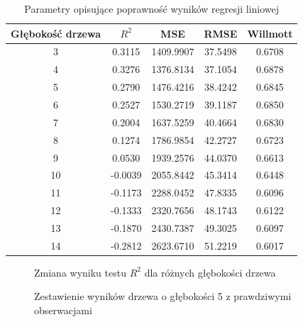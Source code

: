 \documentclass[10pt,a4paper]{article}
\begin{document}
\begin{table}[h!]
	\centering
	\begin{tabular}{|c|c|c|c|c|}
		\hline
		Głębokość drzewa & $R^2$ & MSE & RMSE & Willmott \\
		\hline
		3  & 0.3115 & 1409.9907 & 37.5498 & 0.6708 \\
		4  & 0.3276 & 1376.8134 & 37.1054 & 0.6878 \\
		5  & 0.2790 & 1476.4216 & 38.4242 & 0.6845 \\
		6  & 0.2527 & 1530.2719 & 39.1187 & 0.6850 \\
		7  & 0.2004 & 1637.5259 & 40.4664 & 0.6830 \\
		8  & 0.1274 & 1786.9854 & 42.2727 & 0.6723 \\
		9  & 0.0530 & 1939.2576 & 44.0370 & 0.6613 \\
		10 & -0.0039 & 2055.8442 & 45.3414 & 0.6448 \\
		11 & -0.1173 & 2288.0452 & 47.8335 & 0.6096 \\
		12 & -0.1333 & 2320.7656 & 48.1743 & 0.6122 \\
		13 & -0.1870 & 2430.7387 & 49.3025 & 0.6097 \\
		14 & -0.2812 & 2623.6710 & 51.2219 & 0.6017 \\
		\hline
	\end{tabular}
	\caption{Parametry opisujące poprawność wyników regresji liniowej}
	\label{table:2}
\end{table}
\begin{figure}[!ht]
	\centering
	\caption{Zmiana wyniku testu $R^2$ dla różnych głębokości drzewa}
	\label{figure:treer2}
\end{figure}
\FloatBarrier
\begin{figure}[!ht]
	\centering
	\caption{Zestawienie wyników drzewa o głębokości 5 z prawdziwymi obserwacjami}
	\label{figure:tree5}
\end{figure}
\end{document}
